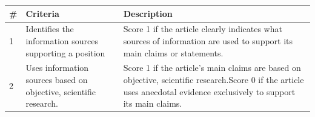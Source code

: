 \documentclass[a4paper,twoside,phd]{BYUPhys}
\begin{document}
\begin{table}[H]
	\centering
	\begin{tabular}{|p{0.3cm}|p{5cm}|p{10cm}|}
		\hline
		\# & Criteria                                                                           & Description                                                                                                                                                                                                                                                                                                                                                             \\
		\hline
		1  & Identifies the information sources supporting a position            & Score 1 if the article clearly indicates what sources of information are used to support its main claims or statements. \\
		\hline
		
		2  & Uses information sources based on objective, scientific research. & Score 1 if the article's main claims are based on objective, scientific research.\newline Score 0 if the article uses anecdotal evidence exclusively to support its main claims.                                                                                                                                                  \\
		\hline
		

\end{tabular}
\end{table}
\end{document}
